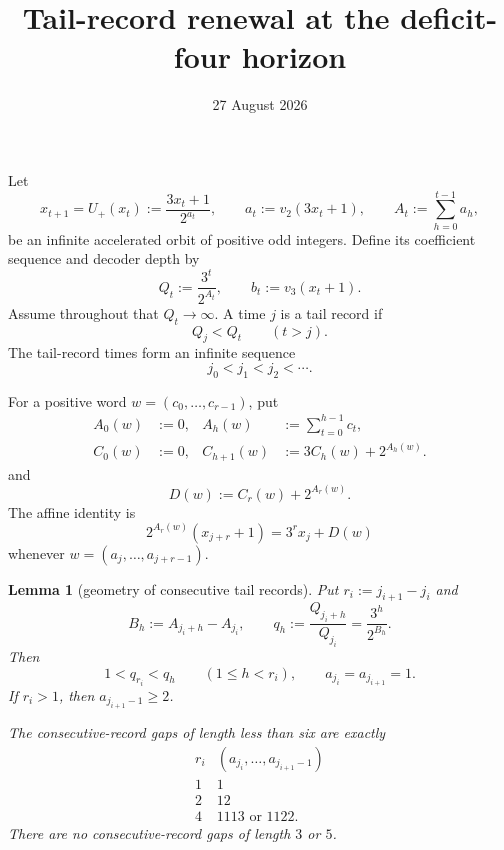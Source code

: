 \documentclass[11pt]{article}
\title{Tail-record renewal at the deficit-four horizon}
\author{}
\date{27 August 2026}
\newtheorem{lemma}[theorem]{Lemma}
\newcommand{\Up}{U_+}
\begin{document}
\maketitle

Let
\[
  x_{t+1}=\Up(x_t):=\frac{3x_t+1}{2^{a_t}},
  \qquad
  a_t:=v_2(3x_t+1),
  \qquad
  A_t:=\sum_{h=0}^{t-1}a_h,
  \tag{1}
\]
be an infinite accelerated orbit of positive odd integers.  Define its
coefficient sequence and decoder depth by
\[
  Q_t:=\frac{3^t}{2^{A_t}},
  \qquad
  b_t:=v_3(x_t+1).
  \tag{2}
\]
Assume throughout that $Q_t\to\infty$.  A time $j$ is a tail record if
\[
  Q_j<Q_t\qquad(t>j).
  \tag{3}
\]
The tail-record times form an infinite sequence
\[
  j_0<j_1<j_2<\cdots.
  \tag{4}
\]

For a positive word $w=(c_0,\ldots,c_{r-1})$, put
\[
\begin{aligned}
  A_0(w)&:=0,
  &A_h(w)&:=\sum_{t=0}^{h-1}c_t,\\
  C_0(w)&:=0,
  &C_{h+1}(w)&:=3C_h(w)+2^{A_h(w)}.
\end{aligned}
\tag{5}
\]
and
\[
  D(w):=C_r(w)+2^{A_r(w)}.
  \tag{6}
\]
The affine identity is
\[
  2^{A_r(w)}(x_{j+r}+1)=3^r x_j+D(w)
  \tag{7}
\]
whenever $w=(a_j,\ldots,a_{j+r-1})$.

\begin{lemma}[geometry of consecutive tail records]
Put $r_i:=j_{i+1}-j_i$ and
\[
  B_h:=A_{j_i+h}-A_{j_i},
  \qquad
  q_h:=\frac{Q_{j_i+h}}{Q_{j_i}}
       =\frac{3^h}{2^{B_h}}.
  \tag{8}
\]
Then
\[
  1<q_{r_i}<q_h
  \qquad(1\leq h<r_i),
  \qquad
  a_{j_i}=a_{j_{i+1}}=1.
  \tag{9}
\]
If $r_i>1$, then $a_{j_{i+1}-1}\geq2$.

The consecutive-record gaps of length less than six are exactly
\[
  \begin{array}{c|c}
    r_i& (a_{j_i},\ldots,a_{j_{i+1}-1})\\ \hline
    1&1\\
    2&12\\
    4&1113\text{ or }1122.
  \end{array}
  \tag{10}
\]
There are no consecutive-record gaps of length $3$ or $5$.
\end{lemma}
\end{document}
